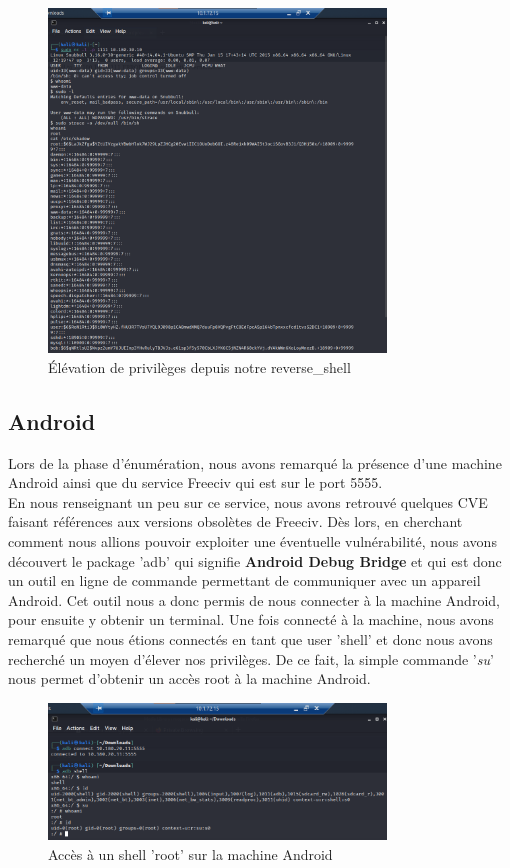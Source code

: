 \documentclass[a4paper]{article}
\begin{document}
\begin{figure}[H]
    \centering
    \includegraphics[width=0.8\textwidth]{images/lab4/shell_root_access_snubull.png}
    \caption{Élévation de privilèges depuis notre reverse\_shell}
    \label{fig:linuxprivesc}
\end{figure}

\newpage
\subsection{Android}

Lors de la phase d'énumération, nous avons remarqué la présence d'une machine Android ainsi que du service Freeciv qui est sur le port 5555.\\
En nous renseignant un peu sur ce service, nous avons retrouvé quelques CVE faisant références aux versions obsolètes de Freeciv. Dès lors, en cherchant comment nous allions pouvoir exploiter une éventuelle vulnérabilité, nous avons découvert le package 'adb' qui signifie \textbf{Android Debug Bridge} et qui est donc un outil en ligne de commande permettant de communiquer avec un appareil Android. Cet outil nous a donc permis de nous connecter à la machine Android, pour ensuite y obtenir un terminal. Une fois connecté à la machine, nous avons remarqué que nous étions connectés en tant que user 'shell' et donc nous avons recherché un moyen d'élever nos privilèges. De ce fait, la simple commande '\emph{su}' nous permet d'obtenir un accès root à la machine Android. \cite{8}

\begin{figure}[H]
    \centering
    \includegraphics[width=0.8\textwidth]{images/lab4/android_shell.png}
    \caption{Accès à un shell 'root' sur la machine Android}
    \label{fig:androidshell}
\end{figure}
\end{document}
